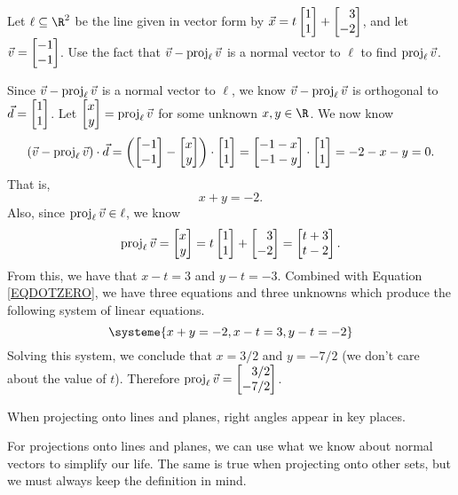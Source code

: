 \begin{example}
	Let $\ell\subseteq \R^2$ be the line given in vector form by $\vec x=t\mat{1\\1}+\mat{3\\-2}$,
	and let $\vec v=\mat{-1\\-1}$. Use the fact that $\vec v-\operatorname{proj}_\ell\vec v$ is a normal vector to $\ell$
	to find $\operatorname{proj}_\ell \vec v$.

	Since $\vec v-\operatorname{proj}_\ell\vec v$ is a normal vector to $\ell$, we know $\vec v-\operatorname{proj}_\ell\vec v$ is orthogonal to $\vec d=\mat{1\\1}$. 
	Let $\mat{x\\y}=\Proj_\ell\vec v$ for some unknown $x,y\in\R$. We now know
	\[
		(\vec v-\Proj_\ell\vec v)\cdot\vec d=\left(\mat{-1\\-1}-\mat{x\\y}\right)\cdot\mat{1\\1}
		=\mat{-1-x\\-1-y}\cdot \mat{1\\1}=-2-x-y=0.
	\]
	That is, 
	\begin{equation}
	\label{EQDOTZERO}
	    x+y=-2.
	\end{equation}
	Also, since $\operatorname{proj}_\ell\vec v\in\ell$, we know
	\[
    		\Proj_\ell\vec v = \mat{x\\y}=t\mat{1\\1}+\mat{3\\-2}=\mat{t+3\\t-2}.
	\]
	From this, we have that $x-t=3$ and $y-t=-3$. Combined with Equation \eqref{EQDOTZERO}, we have
	three equations and three unknowns which produce the following system of linear equations.
	\[
		\systeme{x+y=-2,x-t=3,y-t=-2}
	\]
	Solving this system, we conclude that $x=3/2$ and $y=-7/2$ (we don't care about the value of $t$). Therefore
	 $\Proj_\ell\vec v = \mat{3/2\\-7/2}$. 
\end{example}

\begin{emphbox}[Takeaway]
	When projecting onto lines and planes, right angles appear in key places.
\end{emphbox}

For projections onto lines and planes, we can use what we know about normal vectors to simplify our life.
The same is true when projecting onto other sets, but we must always keep the definition in mind.

